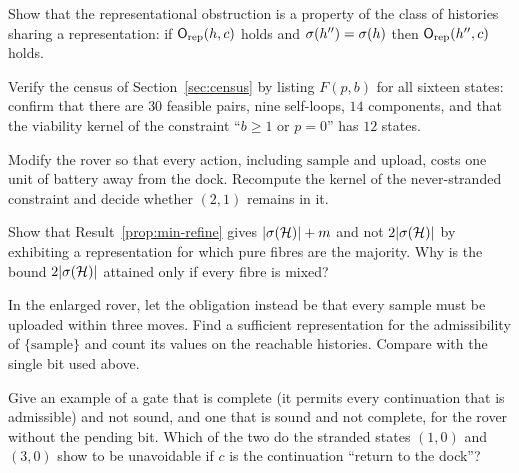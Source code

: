 \begin{exercise}
Show that the representational obstruction is a property of the class of histories sharing a representation: if $\mathsf{O}_{\mathrm{rep}}(h,c)$ holds and $\sigma(h'')=\sigma(h)$ then $\mathsf{O}_{\mathrm{rep}}(h'',c)$ holds.
\end{exercise}

\begin{exercise}
Verify the census of Section~\ref{sec:census} by listing $F(p,b)$ for all sixteen states: confirm that there are $30$ feasible pairs, nine self-loops, $14$ components, and that the viability kernel of the constraint ``$b\ge1$ or $p=0$'' has $12$ states.
\end{exercise}

\begin{exercise}
Modify the rover so that every action, including $\mathrm{sample}$ and $\mathrm{upload}$, costs one unit of battery away from the dock. Recompute the kernel of the never-stranded constraint and decide whether $(2,1)$ remains in it.
\end{exercise}

\begin{exercise}
Show that Result~\ref{prop:min-refine} gives $|\sigma(\mathcal{H})|+m$ and not $2|\sigma(\mathcal{H})|$ by exhibiting a representation for which pure fibres are the majority. Why is the bound $2|\sigma(\mathcal{H})|$ attained only if every fibre is mixed?\label{ex2:min-refine}
\end{exercise}

\begin{exercise}
In the enlarged rover, let the obligation instead be that every sample must be uploaded within three moves. Find a sufficient representation for the admissibility of $\{\mathrm{sample}\}$ and count its values on the reachable histories. Compare with the single bit used above.
\end{exercise}

\begin{exercise}
Give an example of a gate that is complete (it permits every continuation that is admissible) and not sound, and one that is sound and not complete, for the rover without the pending bit. Which of the two do the stranded states $(1,0)$ and $(3,0)$ show to be unavoidable if $c$ is the continuation ``return to the dock''?
\end{exercise}

